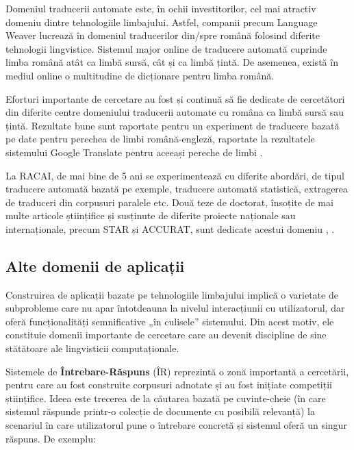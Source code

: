 \begin{multicols}{2}
Domeniul traducerii automate este, în ochii investitorilor, cel mai atractiv domeniu dintre tehnologiile limbajului. Astfel, companii precum Language Weaver lucrează în domeniul traducerilor din/spre română folosind diferite tehnologii lingvistice. Sistemul major online de traducere automată cuprinde limba română atât ca limbă sursă, cât și ca limbă țintă. De asemenea, există în mediul online o multitudine de dicționare pentru limba română.

Eforturi importante de cercetare au fost și continuă să fie dedicate de cercetători din diferite centre domeniului traducerii automate cu româna ca limbă sursă sau țintă. Rezultate bune sunt raportate pentru un experiment de traducere bazată pe date pentru perechea de limbi română-engleză, raportate la rezultatele sistemului Google Translate pentru aceeași pereche de limbi \cite{munteanu}. 

La RACAI, de mai bine de 5 ani se experimentează cu diferite abordări, de tipul traducere automată bazată pe exemple, traducere automată statistică, extragerea de traduceri din corpusuri paralele etc. Două teze de doctorat, însoțite de mai multe articole științifice și susținute de diferite proiecte naționale sau internaționale, precum STAR și ACCURAT, sunt dedicate acestui domeniu \cite{tufisMT}, \cite{irimia}.

\subsection{Alte domenii de aplicații}

Construirea de aplicații bazate pe tehnologiile limbajului implică o varietate de subprobleme care nu apar întotdeauna la nivelul interacțiunii cu utilizatorul, dar oferă funcționalități semnificative „în culisele” sistemului. Din acest motiv, ele constituie domenii importante de cercetare care au devenit discipline de sine stătătoare ale lingvisticii computaționale. 


Sistemele de \textbf{Întrebare-Răspuns} (ÎR) reprezintă o zonă importantă a cercetării, pentru care au fost construite corpusuri adnotate și au fost inițiate competiții științifice. Ideea este trecerea de la căutarea bazată pe cuvinte-cheie (în care sistemul răspunde printr-o colecție de documente cu posibilă relevanță) la scenariul în care utilizatorul pune o întrebare concretă și sistemul oferă un singur răspuns. De exemplu:


\end{multicols}
